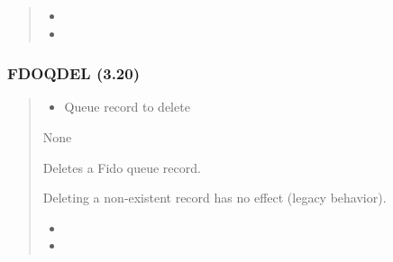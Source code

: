 \documentclass[letterpaper,10pt,english]{sphinxmanual}
\begin{document}
\begin{quote}
\begin{description}
\begin{itemize}
\item {} 
\sphinxAtStartPar
{}

\item {} 
\sphinxAtStartPar
{}

\end{itemize}

\end{description}
\end{quote}


\subsubsection{FDOQDEL (3.20)}
\label{\detokenize{ppl:fdoqdel-3-20}}\begin{quote}

\sphinxAtStartPar
{}
\begin{description}
\begin{itemize}
\item {} 
\sphinxAtStartPar
{} \textendash{} Queue record to delete

\end{itemize}

\sphinxAtStartPar
None

\sphinxAtStartPar
Deletes a Fido queue record.

\end{description}

\sphinxAtStartPar
{}
\begin{quote}

\begin{sphinxVerbatim}[commandchars=\\\{\}]
 
\end{sphinxVerbatim}
\end{quote}
\begin{description}
\sphinxAtStartPar
Deleting a non‑existent record has no effect (legacy behavior).

\begin{itemize}
\item {} 
\sphinxAtStartPar
{}

\item {} 
\sphinxAtStartPar
{}

\end{itemize}

\end{description}
\end{quote}
\end{document}
